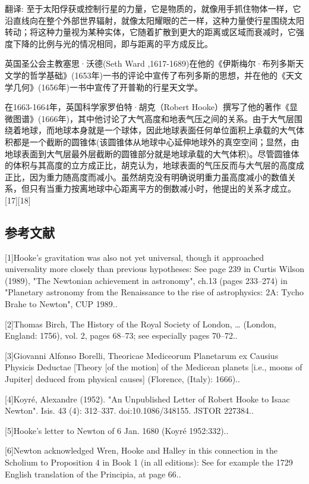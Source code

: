 翻译: 至于太阳俘获或控制行星的力量，它是物质的，就像用手抓住物体一样，它沿直线向在整个外部世界辐射，就像太阳耀眼的芒一样，这种力量使行星围绕太阳转动；将这种力量视为某种实体，它随着扩散到更大的距离或区域而衰减时，它强度下降的比例与光的情况相同，即与距离的平方成反比。

英国圣公会主教塞思·沃德(Seth Ward ,1617-1689)在他的《伊斯梅尔·布列多斯天文学的哲学基础》(1653年)一书的评论中宣传了布列多斯的思想，并在他的《天文学几何》(1656年)一书中宣传了开普勒的行星天文学。

在1663-1664年，英国科学家罗伯特·胡克（Robert Hooke）撰写了他的著作《显微图谱》(1666年)，其中他讨论了大气高度和地表气压之间的关系。由于大气层围绕着地球，而地球本身就是一个球体，因此地球表面任何单位面积上承载的大气体积都是一个截断的圆锥体(该圆锥体从地球中心延伸地球外的真空空间；显然，由地球表面到大气层最外层截断的圆锥部分就是地球承载的大气体积)。尽管圆锥体的体积与其高度的立方成正比，胡克认为，地球表面的气压反而与大气层的高度成正比，因为重力随高度而减小。虽然胡克没有明确说明重力虽高度减小的数值关系，但只有当重力按离地球中心距离平方的倒数减小时，他提出的关系才成立。[17][18]
\subsection{参考文献}
[1]Hooke's gravitation was also not yet universal, though it approached universality more closely than previous hypotheses: See page 239 in Curtis Wilson (1989), "The Newtonian achievement in astronomy", ch.13 (pages 233–274) in "Planetary astronomy from the Renaissance to the rise of astrophysics: 2A: Tycho Brahe to Newton", CUP 1989..

[2]Thomas Birch, The History of the Royal Society of London, … (London, England: 1756), vol. 2, pages 68–73; see especially pages 70–72..

[3]Giovanni Alfonso Borelli, Theoricae Mediceorum Planetarum ex Causius Physicis Deductae [Theory [of the motion] of the Medicean planets [i.e., moons of Jupiter] deduced from physical causes] (Florence, (Italy): 1666)..

[4]Koyré, Alexandre (1952). "An Unpublished Letter of Robert Hooke to Isaac Newton". Isis. 43 (4): 312–337. doi:10.1086/348155. JSTOR 227384..

[5]Hooke's letter to Newton of 6 Jan. 1680 (Koyré 1952:332)..

[6]Newton acknowledged Wren, Hooke and Halley in this connection in the Scholium to Proposition 4 in Book 1 (in all editions): See for example the 1729 English translation of the Principia, at page 66..

